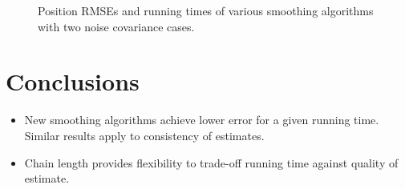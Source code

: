 \documentclass[landscape]{sciposter}
\begin{document}
\begin{multicols}{4}
\begin{figure}[!t]
\centering
{}
\caption{Position RMSEs and running times of various smoothing algorithms with two noise covariance cases.}%
\end{figure}



\section*{Conclusions}

\begin{itemize}
  \item New smoothing algorithms achieve lower error for a given running time. Similar results apply to consistency of estimates.
  \item Chain length provides flexibility to trade-off running time against quality of estimate.
\end{itemize}


{\small


}

\end{multicols}
\end{document}
